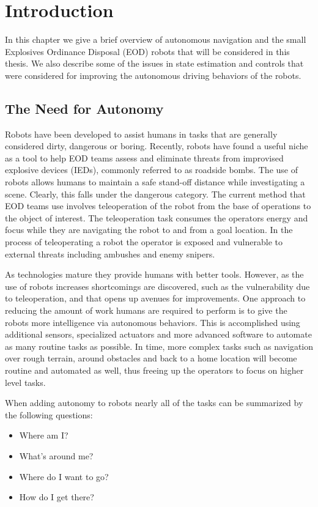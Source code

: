 \chapter{Introduction}
\label{ch:introduction}
In this chapter we give a brief overview of autonomous navigation and the small Explosives Ordinance Disposal (EOD) robots that will be considered in this thesis. We also describe some of the issues in state estimation and controls that were considered for improving the autonomous driving behaviors of the robots.

\section{The Need for Autonomy}
\label{sec:needforautonomy}
Robots have been developed to assist humans in tasks that are generally considered dirty, dangerous or boring. Recently, robots have found a useful niche as a tool to help EOD teams assess and eliminate threats from improvised explosive devices (IEDs), commonly referred to as roadside bombs. The use of robots allows humans to maintain a safe stand-off distance while investigating a scene. Clearly, this falls under the dangerous category. The current method that EOD teams use involves teleoperation of the robot from the base of operations to the object of interest. The teleoperation task consumes the operators energy and focus while they are navigating the robot to and from a goal location. In the process of teleoperating a robot the operator is exposed and vulnerable to external threats including ambushes and enemy snipers.

As technologies mature they provide humans with better tools. However, as the use of robots increases shortcomings are discovered, such as the vulnerability due to teleoperation, and that opens up avenues for improvements. One approach to reducing the amount of work humans are required to perform is to give the robots more intelligence via autonomous behaviors. This is accomplished using additional sensors, specialized actuators and more advanced software to automate as many routine tasks as possible. In time, more complex tasks such as navigation over rough terrain, around obstacles and back to a home location will become routine and automated as well, thus freeing up the operators to focus on higher level tasks.

When adding autonomy to robots nearly all of the tasks can be summarized by the following questions:
\begin{itemize}
\item Where am I?
\item What's around me?
\item Where do I want to go?
\item How do I get there?
\end{itemize}

